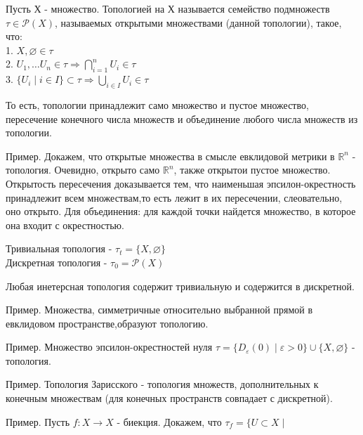 \begin{defin}
    Пусть Х - множество. Топологией на Х называется семейство подмножеств 
    $\tau\in\mathcal{P}(X)$, называемых открытыми множествами (данной 
    топологии), такое, что:\\
    1. $X,\varnothing\in\tau$\\
    2. $U_1,\ldots U_n\in\tau\Rightarrow\bigcap\limits^{n}_{i=1}U_i\in\tau$\\
    3. $\{U_i\mid i\in I\}\subset\tau\Rightarrow\bigcup\limits_{i\in I}U_i\in\tau$
\end{defin}
То есть, топологии принадлежит само множество и пустое множество, пересечение
конечного числа множеств и объединение любого числа множеств из топологии. 

Пример. Докажем, что открытые множества в смысле евклидовой метрики в 
$\mathbb{R}^n$ - топология. Очевидно, открыто само $\mathbb{R}^n$, также 
открытои пустое множество. Открытость пересечения доказывается тем, что
наименьшая эпсилон-окрестность принадлежит всем множествам,то есть лежит в их
пересечении, слеовательно, оно открыто. Для объединения: для каждой точки 
найдется множество, в которое она входит с окрестностью.

\begin{defin}
Тривиальная топология - $\tau_t=\{X,\varnothing\} $ \\
Дискретная топология - $\tau_0=\mathcal{P}(X)$ 
\end{defin}
Любая инетерсная топология содержит тривиальную и содержится в дискретной.

Пример. Множества, симметричные относительно выбранной прямой в евклидовом
пространстве,образуют топологию.

Пример. Множество эпсилон-окрестностей нуля $\tau=\{D_\varepsilon(0)\mid
\varepsilon>0\}\cup\{X,\varnothing\} $
- топология.

Пример. Топология Зарисского - топология множеств, дополнительных к конечным 
множествам (для конечных пространств совпадает с дискретной).

Пример. Пусть $f:X\to X$ - биекция. Докажем, что $\tau_f=\{U\subset X\mid$





